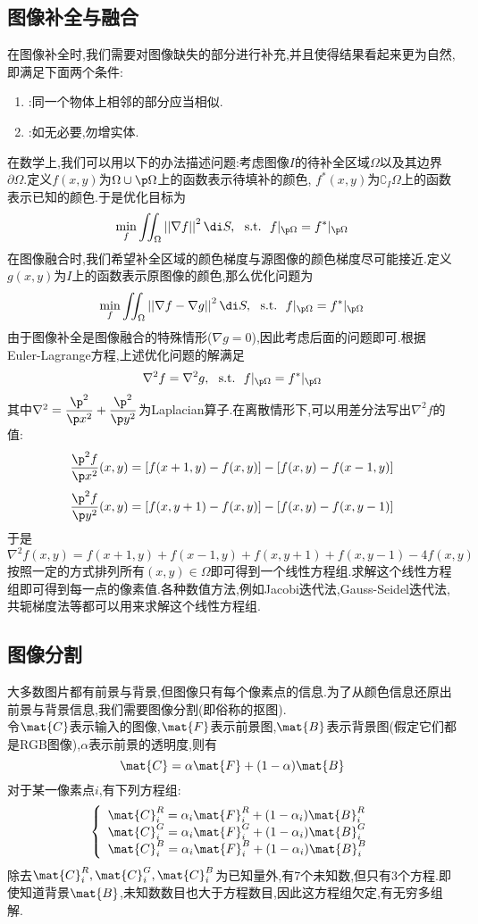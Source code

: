 \documentclass{ctexart}
\begin{document}
\subsection{图像补全与融合}
在图像补全时,我们需要对图像缺失的部分进行补充,并且使得结果看起来更为自然,即满足下面两个条件:
\begin{enumerate}[label=\tbf{\arabic*.},topsep=0pt,parsep=0pt,itemsep=0pt,partopsep=0pt]
    \item {}:同一个物体上相邻的部分应当相似.
    \item {}:如无必要,勿增实体.
\end{enumerate}
\indent 在数学上,我们可以用以下的办法描述问题:考虑图像$I$的待补全区域$\Omega$以及其边界$\partial \Omega$.定义$f(x,y)$为$\Omega\cup\p\Omega$上的函数表示待填补的颜色, $f^\ast(x,y)$为$\complement_I\Omega$上的函数表示已知的颜色.于是优化目标为
\[\min_f\iint_{\Omega}\left|\left|\nabla f\right|\right|^2\di S,\ \ \text{s.t.}\ \ f|_{\p\Omega}=f^\ast|_{\p\Omega}\]
在图像融合时,我们希望补全区域的颜色梯度与源图像的颜色梯度尽可能接近.定义$g(x,y)$为$I$上的函数表示原图像的颜色,那么优化问题为
\[\min_f\iint_{\Omega}\left|\left|\nabla f-\nabla g\right|\right|^2\di S,\ \ \text{s.t.}\ \ f|_{\p\Omega}=f^\ast|_{\p\Omega}\]
由于图像补全是图像融合的特殊情形($\nabla g=0$),因此考虑后面的问题即可.根据Euler-Lagrange方程,上述优化问题的解满足
\[\nabla^2f=\nabla^2g,\ \ \text{s.t.}\ \ f|_{\p\Omega}=f^\ast|_{\p\Omega}\]
其中$\nabla^2=\dfrac{\p^2}{\p x^2}+\dfrac{\p^2}{\p y^2}$为Laplacian算子.在离散情形下,可以用差分法写出$\nabla^2f$的值:
\[\dfrac{\p^2f}{\p x^2}(x,y)=[f(x+1,y)-f(x,y)]-[f(x,y)-f(x-1,y)]\]
\[\dfrac{\p^2f}{\p y^2}(x,y)=[f(x,y+1)-f(x,y)]-[f(x,y)-f(x,y-1)]\]
于是
\[\nabla^2 f(x,y)=f(x+1,y)+f(x-1,y)+f(x,y+1)+f(x,y-1)-4f(x,y)\]
按照一定的方式排列所有$(x,y)\in\Omega$即可得到一个线性方程组.求解这个线性方程组即可得到每一点的像素值.各种数值方法,例如Jacobi迭代法,Gauss-Seidel迭代法,共轭梯度法等都可以用来求解这个线性方程组.
\subsection{图像分割}
大多数图片都有前景与背景,但图像只有每个像素点的信息.为了从颜色信息还原出前景与背景信息,我们需要图像分割(即俗称的抠图).\\
\indent 令$\mat{C}$表示输入的图像,$\mat{F}$表示前景图,$\mat{B}$表示背景图(假定它们都是RGB图像),$\alpha$表示前景的透明度,则有
\[\mat{C}=\alpha\mat{F}+(1-\alpha)\mat{B}\]
对于某一像素点$i$,有下列方程组:
\[\left\{\begin{array}{l}
    \mat{C}_i^R=\alpha_i\mat{F}_i^R+(1-\alpha_i)\mat{B}_i^R\\
    \mat{C}_i^G=\alpha_i\mat{F}_i^G+(1-\alpha_i)\mat{B}_i^G\\
    \mat{C}_i^B=\alpha_i\mat{F}_i^B+(1-\alpha_i)\mat{B}_i^B
\end{array}\right.\]
除去$\mat{C}_i^R,\mat{C}_i^G,\mat{C}_i^B$为已知量外,有7个未知数,但只有3个方程.即使知道背景$\mat{B}$,未知数数目也大于方程数目,因此这方程组欠定,有无穷多组解.
\end{document}
